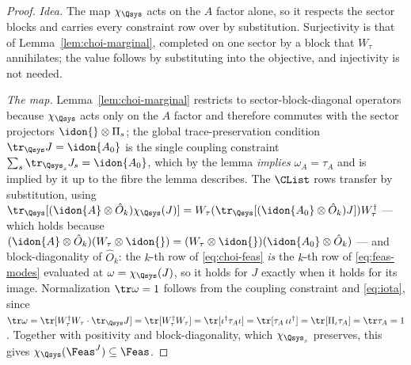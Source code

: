 \begin{proof}
\emph{Idea.} The map $\chi_{\Qsys}$ acts on the $A$ factor alone, so it
respects the sector blocks and carries every constraint row over by
substitution. Surjectivity is that of Lemma~\ref{lem:choi-marginal},
completed on one sector by a block that $W_{\tau}$ annihilates; the value
follows by substituting into the objective, and injectivity is not needed.

\emph{The map.} Lemma~\ref{lem:choi-marginal} restricts to
sector-block-diagonal operators because $\chi_{\Qsys}$ acts only on the
$A$ factor and therefore commutes with the sector projectors
$\idon{}\otimes\Pi_s$; the global trace-preservation condition
$\tr_{\Qsys}J=\idon{A_0}$ is the single coupling constraint
$\sum_s\tr_{\Qsys_s}J_s=\idon{A_0}$, which by the lemma \emph{implies}
$\omega_A=\tau_A$ and is implied by it up to the fibre the lemma
describes. The $\CList$ rows transfer by substitution, using
$\tr_{\Qsys}[(\idon{A}\otimes\hat O_k)\chi_{\Qsys}(J)]
=W_{\tau}(\tr_{\Qsys}[(\idon{A_0}\otimes\hat O_k)J])W_{\tau}^{\dagger}$
--- which holds because
$(\idon{A}\otimes\hat O_k)(W_{\tau}\otimes\idon{})
=(W_{\tau}\otimes\idon{})(\idon{A_0}\otimes\hat O_k)$ --- and
block-diagonality of $\hat O_k$: the $k$-th row of \eqref{eq:choi-feas}
\emph{is} the $k$-th row of \eqref{eq:feas-modes} evaluated at
$\omega=\chi_{\Qsys}(J)$, so it holds for $J$ exactly when it holds for
its image. Normalization $\tr\omega=1$ follows from the coupling
constraint and \eqref{eq:iota}, since
$\tr\omega=\tr[W_{\tau}^{\dagger}W_{\tau}\cdot\tr_{\Qsys}J]
=\tr[W_{\tau}^{\dagger}W_{\tau}]
=\tr[\iota^{\dagger}\tau_A\iota]=\tr[\tau_A\,\iota\iota^{\dagger}]
=\tr[\Pi_{\iota}\tau_A]=\tr\tau_A=1$. Together with positivity and
block-diagonality, which $\chi_{\Qsys_s}$ preserves, this gives
$\chi_{\Qsys}(\Feas^{J})\subseteq\Feas$.


\end{proof}
